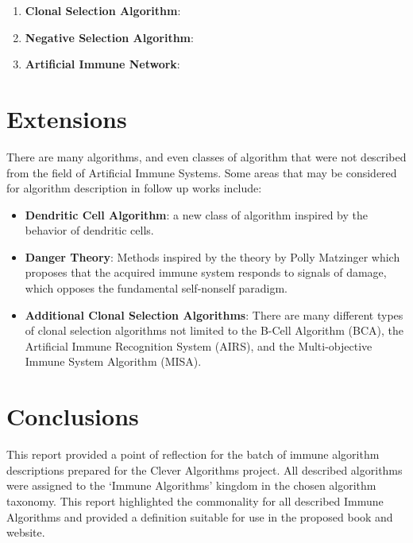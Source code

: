\documentclass[a4paper, 11pt]{article}
\begin{document}
\begin{enumerate}
	\item \textbf{Clonal Selection Algorithm}: \cite{Brownlee2010z}
	\item \textbf{Negative Selection Algorithm}: \cite{Brownlee2010aa}
	\item \textbf{Artificial Immune Network}: \cite{Brownlee2010ab}
\end{enumerate}

% 
% 
\section{Extensions}
\label{sec:extensions}
There are many algorithms, and even classes of algorithm that were not described from the field of Artificial Immune Systems. Some areas that may be considered for algorithm description in follow up works include:

\begin{itemize}
	\item \textbf{Dendritic Cell Algorithm}: a new class of algorithm inspired by the behavior of dendritic cells.
	\item \textbf{Danger Theory}: Methods inspired by the theory by Polly Matzinger \cite{Matzinger1994, Matzinger2002} which proposes that the acquired immune system responds to signals of damage, which opposes the fundamental self-nonself paradigm. 
	\item \textbf{Additional Clonal Selection Algorithms}: There are many different types of clonal selection algorithms not limited to the B-Cell Algorithm (BCA), the Artificial Immune Recognition System (AIRS), and the Multi-objective Immune System Algorithm (MISA).
\end{itemize}

% 
% 
\section{Conclusions}
\label{sec:conclusions}
This report provided a point of reflection for the batch of immune algorithm descriptions prepared for the Clever Algorithms project. All described algorithms were assigned to the `Immune Algorithms' kingdom in the chosen algorithm taxonomy. This report highlighted the commonality for all described Immune Algorithms and provided a definition suitable for use in the proposed book and website.




\end{document}

